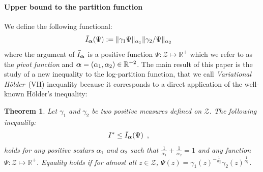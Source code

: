 \documentclass{article} %
\newcommand{\Holder}{H\"older\xspace}
\newcommand{\Zspace}{\mathcal{Z}}
\newcommand{\LSE}[3]{\bar{\mathbb{E}}_{#1}^{#2}\left[#3\right]}
\newcommand{\Expectation}[2]{\int{#2}d\nu(\Z)}
\def\X{X}
\def\Z{Z}
\def\z{z}
\renewcommand{\Re}{\mathbb{R}}
\newtheorem{theorem}{Theorem}
\begin{document}
\paragraph{Upper bound to the partition function}
We define the following functional:
\begin{eqnarray}
\label{eq:VH}
\bar I_{\bm{\alpha}}(\Psi)&:=
		\|\gamma_1\Psi\|_{\alpha_1}\|\gamma_2/\Psi\|_{\alpha_2}
\end{eqnarray}
where the argument of $\bar I_{\bm{\alpha}}$ is a positive function $\Psi:\Zspace\mapsto \Re^+$ %
which we refer to as the \emph{pivot function}
and $\balpha=(\alpha_1,\alpha_2)\in\Re^{+2}$. 
The main result of this paper is the study of a new inequality to the log-partition function, that we call \emph{Variational \Holder}~(VH) inequality because it
corresponds to a direct application of the well-known \Holder's inequality:
\begin{theorem}
\label{th:VH}
Let $\gamma_1$ and $\gamma_2$ be two positive measures defined on $\Zspace$. 
The following inequality:
\begin{align}
\label{eq:VH-logspace}
&I^* \le \bar I_{\bm{\alpha}}(\Psi)
\enspace,
\end{align}
holds for any positive scalars $\alpha_1$ and $\alpha_2$ such that $\frac{1}{\alpha_1} + \frac{1}{\alpha_2}=1$ and any function $\Psi:\Zspace\mapsto \Re^+$.
Equality holds if for almost all $\z\in\Zspace$, 
$\Psi(\z) = \gamma_1(\z)^{-\frac {1}{\alpha_2}}  \gamma_2(\z)^{\frac{1} {\alpha_1}}$.
\end{theorem}
\end{document}
